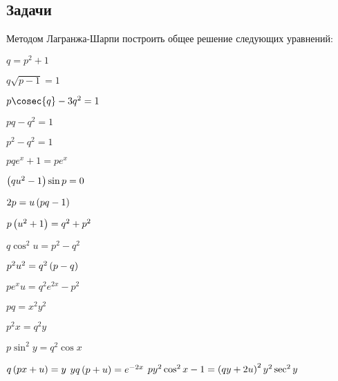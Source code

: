 \subsection{Задачи}

	Методом Лагранжа-Шарпи построить общее решение следующих уравнений:

	\begin{multicols}{2}
		\begin{enumtasks}

			\label{charpit_lagrange:general_solution}
			\item \( q = p^2 + 1 \) %
			\item \( q \sqrt{p - 1} = 1 \)	%
			\item \( p \cosec{q} - 3q^2 = 1 \) %
			\item \( pq - q^2 = 1 \) %
			\item \( p^2 - q^2 = 1 \) %
			\item \( pq e^x + 1 = p e^x \) %
			\item \( \left( qu^2 - 1 \right) \sin{p} = 0 \) %
			\item \( 2p = u \left( pq - 1 \right) \) %
			\item \( p \left( u^2 + 1 \right) = q^2 + p^2 \) %
			\item \( q \cos^2{u} = p^2 - q^2 \) %
			\item \( p^2 u^2 = q^2 \left( p - q \right) \) %
			\item \( pe^{x} u = q^2 e^{2x} - p^2 \) %
			\item \( pq = x^2 y^2 \) %
			\item \( p^2 x = q^2 y \) %
			\item \( p \sin^2{y} = q^2 \cos{x} \) %
			\item \( q\left( px + u \right) = y \) %
			\itemstar \( yq \left( p + u \right) = e^{-2x} \) %
			\itemdstar \( py^2 \cos^2{x} - 1 = \left( qy + 2u \right)^2 y^2 \sec^2{y} \) %


\end{enumtasks}
\end{multicols}
